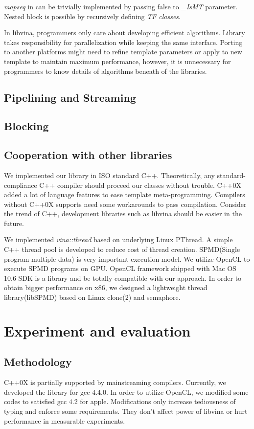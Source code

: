 \documentclass[10pt, conference, compsocconf]{IEEEtran}
\begin{document}
\emph{mapseq} in \cite{1} can be trivially implemented by passing false to \emph{\_IsMT} parameter. Nested block is possible by recursively defining \emph{TF classes}.

In libvina, programmers only care about developing efficient algorithms. Library takes responsibility for parallelization while keeping the same interface. Porting to another platforms might need to refine template parameters or apply to new template to maintain maximum performance, however, it is unnecessary for programmers to know details of algorithms beneath of the libraries.
\subsection{Pipelining and Streaming}
\subsection{Blocking}
\subsection{Cooperation with other libraries}
We implemented our library in ISO standard C++. Theoretically, any standard-compliance C++ compiler should proceed our classes without trouble. C++0X \cite{17} added a lot of language features to ease template meta-programming. Compilers without C++0X supports need some workarounds to pass compilation. Consider the trend of C++, development libraries such as libvina should be easier in the future. 

We implemented \emph{vina::thread} based on underlying Linux PThread. A simple C++ thread pool is developed to reduce cost of thread creation. SPMD(Single program multiple data) is very important execution model. We utilize OpenCL to execute SPMD programs on GPU. OpenCL framework shipped with Mac OS 10.6 SDK is a library and be totally compatible with our approach. In order to obtain bigger performance on x86, we designed a lightweight thread library(libSPMD) based on Linux clone(2) and semaphore.

\section{Experiment and evaluation}
\subsection{Methodology}
C++0X is partially supported by mainstreaming compilers. Currently, we developed the library for gcc 4.4.0. In order to utilize OpenCL, we modified some codes to satisfied gcc 4.2 for apple. Modifications only increase tediousness of typing and enforce some requirements. They don't affect power of libvina or hurt performance in measurable experiments.
\end{document}
